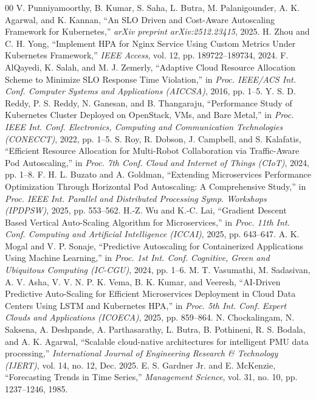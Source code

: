 \documentclass[conference]{IEEEtran}
\begin{document}
\begin{thebibliography}{00}
 V. Punniyamoorthy, B. Kumar, S. Saha, L. Butra, M. Palanigounder, A. K. Agarwal,
and K. Kannan, ``An SLO Driven and Cost-Aware Autoscaling Framework for Kubernetes,'' \emph{arXiv
preprint arXiv:2512.23415}, 2025.
 H. Zhou and C. H. Yong, ``Implement HPA for Nginx Service Using Custom Metrics Under
Kubernetes Framework,'' \emph{IEEE Access}, vol. 12, pp. 189722--189734, 2024.
 F. AlQayedi, K. Salah, and M. J. Zemerly, ``Adaptive Cloud Resource Allocation Scheme to
Minimize SLO Response Time Violation,'' in \emph{Proc. IEEE/ACS Int. Conf. Computer Systems and
Applications (AICCSA)}, 2016, pp. 1--5.
 Y. S. D. Reddy, P. S. Reddy, N. Ganesan, and B. Thangaraju, ``Performance Study of
Kubernetes Cluster Deployed on OpenStack, VMs, and Bare Metal,'' in \emph{Proc. IEEE Int. Conf.
Electronics, Computing and Communication Technologies (CONECCT)}, 2022, pp. 1--5.
 S. Roy, R. Dobson, J. Campbell, and S. Kalafatis, ``Efficient Resource Allocation for
Multi-Robot Collaboration via Traffic-Aware Pod Autoscaling,'' in \emph{Proc. 7th Conf. Cloud and
Internet of Things (CIoT)}, 2024, pp. 1--8.
 F. H. L. Buzato and A. Goldman, ``Extending Microservices Performance Optimization
Through Horizontal Pod Autoscaling: A Comprehensive Study,'' in \emph{Proc. IEEE Int. Parallel and
Distributed Processing Symp. Workshops (IPDPSW)}, 2025, pp. 553--562.
 H.-Z. Wu and K.-C. Lai, ``Gradient Descent Based Vertical Auto-Scaling Algorithm for
Microservices,'' in \emph{Proc. 11th Int. Conf. Computing and Artificial Intelligence (ICCAI)}, 2025,
pp. 643--647.
 A. K. Mogal and V. P. Sonaje, ``Predictive Autoscaling for Containerized Applications
Using Machine Learning,'' in \emph{Proc. 1st Int. Conf. Cognitive, Green and Ubiquitous Computing
(IC-CGU)}, 2024, pp. 1--6.
 M. T. Vasumathi, M. Sadasivan, A. V. Asha, V. V. N. P. K. Vema, B. K. Kumar, and
Veeresh, ``AI-Driven Predictive Auto-Scaling for Efficient Microservices Deployment in Cloud Data
Centers Using LSTM and Kubernetes HPA,'' in \emph{Proc. 5th Int. Conf. Expert Clouds and Applications
(ICOECA)}, 2025, pp. 859--864.
 N. Chockalingam, N. Saksena, A. Deshpande, A. Parthasarathy, L. Butra, B. Pothineni,
R. S. Bodala, and A. K. Agarwal, ``Scalable cloud-native architectures for intelligent PMU data
processing,'' \emph{International Journal of Engineering Research \& Technology (IJERT)}, vol. 14,
no. 12, Dec. 2025.
 E. S. Gardner Jr. and E. McKenzie, ``Forecasting Trends in Time Series,''
\emph{Management Science}, vol. 31, no. 10, pp. 1237--1246, 1985.
\end{thebibliography}
\end{document}
